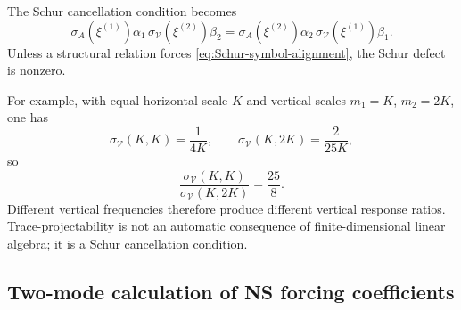 \documentclass[11pt]{article}
\numberwithin{equation}{section}
\newcommand{\calV}{\mathcal V}
\begin{document}
The Schur cancellation condition becomes
\begin{equation}\label{eq:Schur-symbol-alignment}
        \sigma_A(\xi^{(1)})\alpha_1\,
        \sigma_{\calV}(\xi^{(2)})\beta_2
        =
        \sigma_A(\xi^{(2)})\alpha_2\,
        \sigma_{\calV}(\xi^{(1)})\beta_1.
\end{equation}
Unless a structural relation forces \eqref{eq:Schur-symbol-alignment}, the Schur defect is nonzero.

For example, with equal horizontal scale \(K\) and vertical scales \(m_1=K\), \(m_2=2K\), one has
\[
        \sigma_{\calV}(K,K)=\frac1{4K},
        \qquad
        \sigma_{\calV}(K,2K)=\frac{2}{25K},
\]
so
\[
        \frac{\sigma_{\calV}(K,K)}{\sigma_{\calV}(K,2K)}=\frac{25}{8}.
\]
Different vertical frequencies therefore produce different vertical response ratios.  Trace-projectability is not an automatic consequence of finite-dimensional linear algebra; it is a Schur cancellation condition.

\subsection{Two-mode calculation of NS forcing coefficients}\label{subsec:two-mode-forcing-coefficients}
\end{document}
